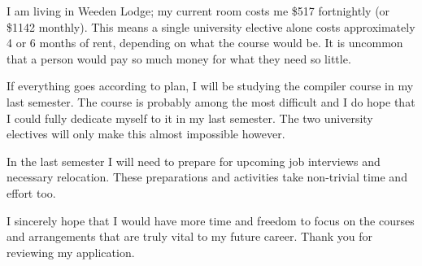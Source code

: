 \documentclass[12pt,a4paper]{article}
\begin{document}
I am living in Weeden Lodge; my current room costs me \$517 fortnightly (or \$1142 monthly).  This means a single university elective alone costs approximately 4 or 6 months of rent, depending on what the course would be.  It is uncommon that a person would pay so much money for what they need so little.

If everything goes according to plan, I will be studying the compiler course in my last semester.  The course is probably among the most difficult and I do hope that I could fully dedicate myself to it in my last semester.  The two university electives will only make this almost impossible however.

In the last semester I will need to prepare for upcoming job interviews and necessary relocation.  These preparations and activities take non-trivial time and effort too.

I sincerely hope that I would have more time and freedom to focus on the courses and arrangements that are truly vital to my future career.  Thank you for reviewing my application.
\end{document}
